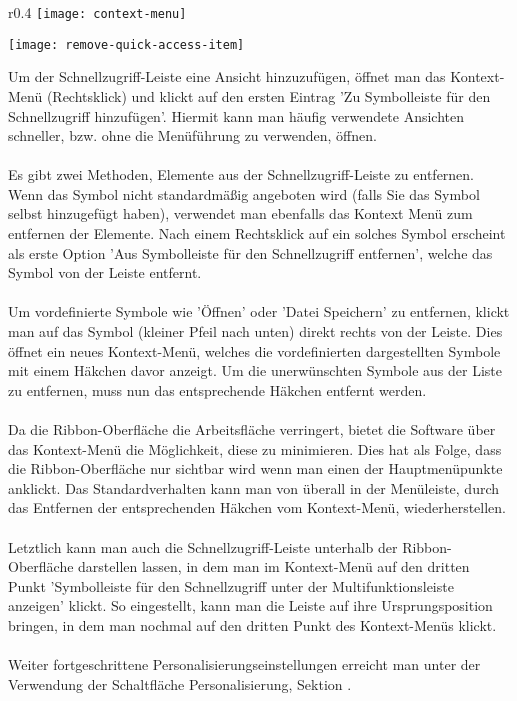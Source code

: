\begin{wrapfigure}{r}{0.4\textwidth}
	\vspace{-4pt}
	\texttt{[image: context-menu]}
	\vspace{-5pt}
	\caption{Kontext Menü}
	\label{fig:context-menu}
	\vspace{50pt}
	\texttt{[image: remove-quick-access-item]}
	\vspace{-5pt}
	\caption{Vordefinierte Symbole\newline Entfernen}
	\label{fig:remove-quick-access-item}
	\vspace{4pt}
\end{wrapfigure}

\noindent
Um der Schnellzugriff-Leiste eine Ansicht hinzuzufügen, öffnet man das Kontext-Menü (Rechtsklick) und klickt auf den ersten Eintrag 'Zu Symbolleiste für den Schnellzugriff hinzufügen'. Hiermit kann man häufig verwendete Ansichten schneller, bzw. ohne die Menüführung zu verwenden, öffnen.\\
\\
Es gibt zwei Methoden, Elemente aus der Schnellzugriff-Leiste zu entfernen. Wenn das Symbol nicht standardmäßig angeboten wird (falls Sie das Symbol selbst hinzugefügt haben), verwendet man ebenfalls das Kontext Menü zum entfernen der Elemente. Nach einem Rechtsklick auf ein solches Symbol erscheint als erste Option 'Aus Symbolleiste für den Schnellzugriff entfernen', welche das Symbol von der Leiste entfernt.\\
\\
Um vordefinierte Symbole wie 'Öffnen' oder 'Datei Speichern' zu entfernen, klickt man auf das Symbol (kleiner Pfeil nach unten) direkt rechts von der Leiste. Dies öffnet ein neues Kontext-Menü, welches die vordefinierten dargestellten Symbole mit einem Häkchen davor anzeigt. Um die unerwünschten Symbole aus der Liste zu entfernen, muss nun das entsprechende Häkchen entfernt werden.\\
\\
Da die Ribbon-Oberfläche die Arbeitsfläche verringert, bietet die Software über das Kontext-Menü die Möglichkeit, diese zu minimieren. Dies hat als Folge, dass die Ribbon-Oberfläche nur sichtbar wird wenn man einen der Hauptmenüpunkte anklickt. Das Standardverhalten kann man von überall in der Menüleiste, durch das Entfernen der entsprechenden Häkchen vom Kontext-Menü, wiederherstellen.\\
\\
Letztlich kann man auch die Schnellzugriff-Leiste unterhalb der Ribbon-Oberfläche darstellen lassen, in dem man im Kontext-Menü auf den dritten Punkt 'Symbolleiste für den Schnellzugriff unter der Multifunktionsleiste anzeigen' klickt. So eingestellt, kann man die Leiste auf ihre Ursprungsposition bringen, in dem man nochmal auf den dritten Punkt des Kontext-Menüs klickt.\\
\\
Weiter fortgeschrittene Personalisierungseinstellungen erreicht man unter der Verwendung der Schaltfläche Personalisierung, Sektion .

